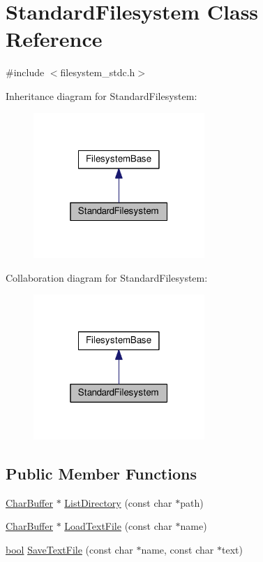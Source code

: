 \hypertarget{classStandardFilesystem}{}\section{Standard\+Filesystem Class Reference}
\label{classStandardFilesystem}


{\ttfamily \#include $<$filesystem\+\_\+stdc.\+h$>$}



Inheritance diagram for Standard\+Filesystem\+:\nopagebreak
\begin{figure}[H]
\begin{center}
\leavevmode
\includegraphics[width=184pt]{classStandardFilesystem__inherit__graph}
\end{center}
\end{figure}


Collaboration diagram for Standard\+Filesystem\+:\nopagebreak
\begin{figure}[H]
\begin{center}
\leavevmode
\includegraphics[width=184pt]{classStandardFilesystem__coll__graph}
\end{center}
\end{figure}
\subsection*{Public Member Functions}
\begin{DoxyCompactItemize}
\item 
\hyperlink{classCharBuffer}{Char\+Buffer} $\ast$ \hyperlink{classStandardFilesystem_a535ef937063f59dcb61560d44ed18e81}{List\+Directory} (const char $\ast$path)
\item 
\hyperlink{classCharBuffer}{Char\+Buffer} $\ast$ \hyperlink{classStandardFilesystem_aa01514561ced127f2453b3a913e077ef}{Load\+Text\+File} (const char $\ast$name)
\item 
\hyperlink{platform_8h_a1062901a7428fdd9c7f180f5e01ea056}{bool} \hyperlink{classStandardFilesystem_ad2e93d1364a5b9491e14b54cb7fe924f}{Save\+Text\+File} (const char $\ast$name, const char $\ast$text)
\end{DoxyCompactItemize}
